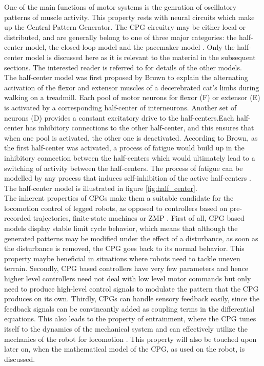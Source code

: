 \documentclass[12pt,twoside]{article}
\theoremstyle{plain}
\theoremstyle{definition}
\theoremstyle{remark}
\newcommand{\forceindent}{\leavevmode{\parindent=2em\indent}}
\begin{document}
\forceindent One of the main functions of motor systems is the genration of oscillatory patterns of muscle activity. This property rests with neural circuits which make up the Central Pattern Generator. The CPG circuitry may be either local or distributed, and are generally belong to one of three major categories: the half-center model, the closed-loop model and the pacemaker model \cite{neurobiology1994shepherd}. Only the half-center model is discussed here as it is relevant to the material in the subsequent sections. The interested reader is referred to \cite{neurobiology1994shepherd} for details of the other models.\\
\forceindent The half-center model was first proposed by Brown \cite{brown1914nature} to explain the alternating activation of the flexor and extensor muscles of a decerebrated cat's limbs during walking on a treadmill. Each pool of motor neurons for flexor (F) or extensor (E) is activated by a corresponding half-center of interneurons. Another set of neurons (D) provides a constant excitatory drive to the half-centers.Each half-center has inhibitory connections to the other half-center, and this ensures that when one pool is activated, the other one is deactivated. According to Brown, as the first half-center was activated, a process of fatigue would build up in the inhibitory connection between the half-centers which would ultimately lead to a switching of activity between the half-centers. The process of fatigue can be modelled by any process that induces self-inhibition of the active half-centers \cite{neurobiology1994shepherd}. The half-center model is illustrated in figure \ref{fig:half_center}.\\
\forceindent The inherent properties of CPGs make them a suitable candidate for the locomotion control of legged robots, as opposed to controllers based on pre-recorded trajectories, finite-state machines or ZMP \cite{Ijspeert2008}. First of all, CPG based models display stable limit cycle behavior, which means that although the generated patterns may be modified under the effect of a disturbance, as soon as the disturbance is removed, the CPG goes back to its normal behavior. This property maybe beneficial in situations where robots need to tackle uneven terrain. Secondly, CPG based controllers have very few parameters and hence higher level controllers need not deal with low level motor commands but only need to produce high-level control signals to modulate the pattern that the CPG produces on its own. Thirdly, CPGs can handle sensory feedback easily, since the feedback signals can be convineantly added as coupling terms in the differential equations. This also leads to the property of entrainment, where the CPG tunes itself to the dynamics of the mechanical system and can effectively utilize the mechanics of the robot for locomotion \cite{Ijspeert2008}. This property will also be touched upon later on, when the mathematical model of the CPG, as used on the robot, is discussed.
\end{document}
